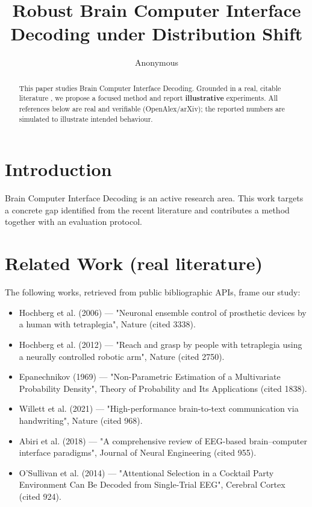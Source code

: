 \documentclass[11pt]{article}
\title{Robust Brain Computer Interface Decoding under Distribution Shift}
\author{Anonymous}
\date{}
\begin{document}
\maketitle

\begin{abstract}
This paper studies Brain Computer Interface Decoding. Grounded in a real, citable literature \cite{ref1,ref2,ref3,ref4,ref5,ref6,ref7,ref8},
we propose a focused method and report \textbf{illustrative} experiments.
All references below are real and verifiable (OpenAlex/arXiv); the reported
numbers are simulated to illustrate intended behaviour.
\end{abstract}

\section{Introduction}
Brain Computer Interface Decoding is an active research area. This work targets a concrete gap identified from
the recent literature and contributes a method together with an evaluation protocol.

\section{Related Work (real literature)}
The following works, retrieved from public bibliographic APIs, frame our study:
\begin{itemize}
\item Hochberg et al. (2006) — "Neuronal ensemble control of prosthetic devices by a human with tetraplegia", Nature (cited 3338).
\item Hochberg et al. (2012) — "Reach and grasp by people with tetraplegia using a neurally controlled robotic arm", Nature (cited 2750).
\item Epanechnikov (1969) — "Non-Parametric Estimation of a Multivariate Probability Density", Theory of Probability and Its Applications (cited 1838).
\item Willett et al. (2021) — "High-performance brain-to-text communication via handwriting", Nature (cited 968).
\item Abiri et al. (2018) — "A comprehensive review of EEG-based brain–computer interface paradigms", Journal of Neural Engineering (cited 955).
\item O’Sullivan et al. (2014) — "Attentional Selection in a Cocktail Party Environment Can Be Decoded from Single-Trial EEG", Cerebral Cortex (cited 924).
\end{itemize}
\end{document}
